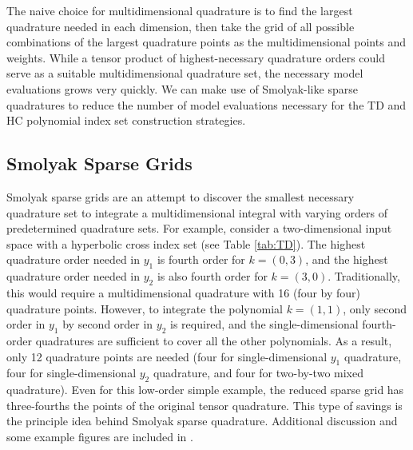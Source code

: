 The naive choice for multidimensional quadrature is to find the largest quadrature needed in each dimension,
then take the grid of all possible combinations of the largest quadrature points as the multidimensional
points and weights.
While a tensor product of highest-necessary quadrature orders could serve as a suitable multidimensional
quadrature set, the necessary model evaluations grows very quickly.  We can make use of Smolyak-like sparse 
quadratures to reduce the number of model
evaluations necessary for the TD and HC polynomial index set construction strategies.

\subsection{Smolyak Sparse Grids}
Smolyak sparse grids \cite{smolyak} are an attempt to discover the smallest necessary quadrature set to
integrate a multidimensional integral with varying orders of predetermined quadrature sets.  For example,
consider a two-dimensional input space with a hyperbolic cross index set (see Table \ref{tab:TD}).  The
highest quadrature order needed in $y_1$ is fourth order for $k=(0,3)$, and the highest quadrature order needed
in $y_2$ is also fourth order for $k=(3,0)$.  Traditionally, this would require a multidimensional quadrature
with 16 (four by four) quadrature points.  However, to integrate the polynomial $k=(1,1)$, only second order
in $y_1$ by second order in $y_2$ is required, and the single-dimensional fourth-order quadratures are
sufficient to cover all the other polynomials.  As a result, only 12 quadrature points are needed (four for
single-dimensional $y_1$ quadrature, four for single-dimensional $y_2$ quadrature, and four for two-by-two
mixed quadrature).  Even for this low-order simple example, the reduced sparse grid has three-fourths the
points of the original tensor quadrature.  This type of savings is the principle idea behind Smolyak sparse 
quadrature.  Additional discussion and some example figures are included in \cite{Ayres}.

